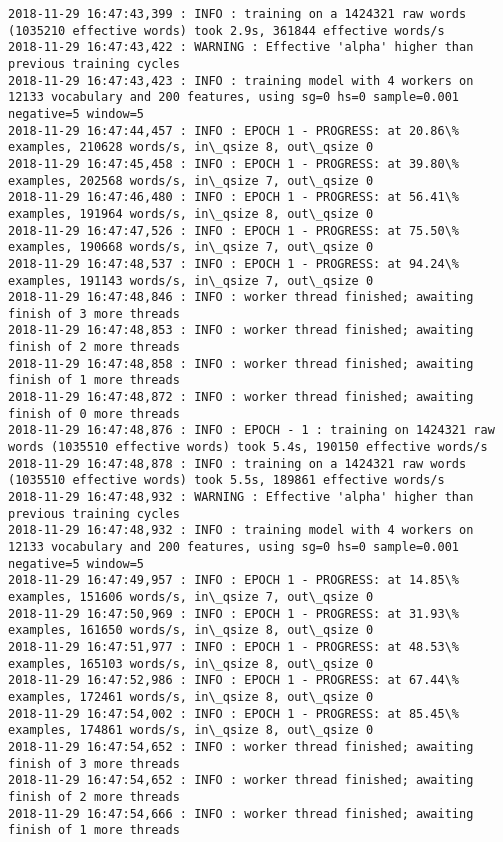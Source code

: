 \documentclass[11pt]{article}
\begin{document}
\begin{Verbatim}[commandchars=\\\{\}]
2018-11-29 16:47:43,399 : INFO : training on a 1424321 raw words (1035210 effective words) took 2.9s, 361844 effective words/s
2018-11-29 16:47:43,422 : WARNING : Effective 'alpha' higher than previous training cycles
2018-11-29 16:47:43,423 : INFO : training model with 4 workers on 12133 vocabulary and 200 features, using sg=0 hs=0 sample=0.001 negative=5 window=5
2018-11-29 16:47:44,457 : INFO : EPOCH 1 - PROGRESS: at 20.86\% examples, 210628 words/s, in\_qsize 8, out\_qsize 0
2018-11-29 16:47:45,458 : INFO : EPOCH 1 - PROGRESS: at 39.80\% examples, 202568 words/s, in\_qsize 7, out\_qsize 0
2018-11-29 16:47:46,480 : INFO : EPOCH 1 - PROGRESS: at 56.41\% examples, 191964 words/s, in\_qsize 8, out\_qsize 0
2018-11-29 16:47:47,526 : INFO : EPOCH 1 - PROGRESS: at 75.50\% examples, 190668 words/s, in\_qsize 7, out\_qsize 0
2018-11-29 16:47:48,537 : INFO : EPOCH 1 - PROGRESS: at 94.24\% examples, 191143 words/s, in\_qsize 7, out\_qsize 0
2018-11-29 16:47:48,846 : INFO : worker thread finished; awaiting finish of 3 more threads
2018-11-29 16:47:48,853 : INFO : worker thread finished; awaiting finish of 2 more threads
2018-11-29 16:47:48,858 : INFO : worker thread finished; awaiting finish of 1 more threads
2018-11-29 16:47:48,872 : INFO : worker thread finished; awaiting finish of 0 more threads
2018-11-29 16:47:48,876 : INFO : EPOCH - 1 : training on 1424321 raw words (1035510 effective words) took 5.4s, 190150 effective words/s
2018-11-29 16:47:48,878 : INFO : training on a 1424321 raw words (1035510 effective words) took 5.5s, 189861 effective words/s
2018-11-29 16:47:48,932 : WARNING : Effective 'alpha' higher than previous training cycles
2018-11-29 16:47:48,932 : INFO : training model with 4 workers on 12133 vocabulary and 200 features, using sg=0 hs=0 sample=0.001 negative=5 window=5
2018-11-29 16:47:49,957 : INFO : EPOCH 1 - PROGRESS: at 14.85\% examples, 151606 words/s, in\_qsize 7, out\_qsize 0
2018-11-29 16:47:50,969 : INFO : EPOCH 1 - PROGRESS: at 31.93\% examples, 161650 words/s, in\_qsize 8, out\_qsize 0
2018-11-29 16:47:51,977 : INFO : EPOCH 1 - PROGRESS: at 48.53\% examples, 165103 words/s, in\_qsize 8, out\_qsize 0
2018-11-29 16:47:52,986 : INFO : EPOCH 1 - PROGRESS: at 67.44\% examples, 172461 words/s, in\_qsize 8, out\_qsize 0
2018-11-29 16:47:54,002 : INFO : EPOCH 1 - PROGRESS: at 85.45\% examples, 174861 words/s, in\_qsize 8, out\_qsize 0
2018-11-29 16:47:54,652 : INFO : worker thread finished; awaiting finish of 3 more threads
2018-11-29 16:47:54,652 : INFO : worker thread finished; awaiting finish of 2 more threads
2018-11-29 16:47:54,666 : INFO : worker thread finished; awaiting finish of 1 more threads

\end{Verbatim}
\end{document}
